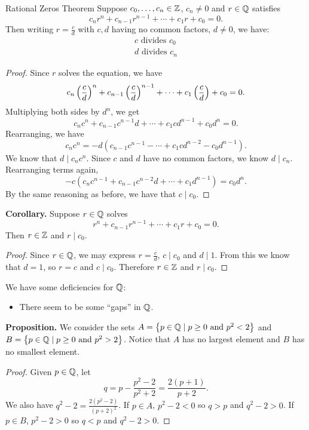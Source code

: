 \documentclass[class=article, crop=false]{standalone}
\begin{document}
  \begin{theorem}{Rational Zeros Theorem}
    Suppose $c_0,\dotsc,c_n\in\mathbb{Z}$, $c_n\neq 0$ and $r\in\mathbb{Q}$ satisfies
    \[
      c_nr^n + c_{n-1}r^{n-1} + \dotsb + c_1r + c_0 = 0.
    \]
    Then writing $r = \frac{c}{d}$ with $c, d$ having no common factors, $d\neq 0$, we have:
    \begin{align*}
      c \text{ divides } c_0 \\
      d \text{ divides } c_n
    \end{align*}
    \begin{proof}
      Since $r$ solves the equation, we have
      \[
        c_n \left( \frac{c}{d} \right)^n + c_{n-1} \left( \frac{c}{d} \right)^{n-1} + \dotsb + c_1 \left( \frac{c}{d} \right) + c_0 = 0.
      \]
      Multiplying both sides by $d^n$, we get
      \[
        c_nc^n + c_{n-1}c^{n-1}d + \dotsb + c_1cd^{n-1} + c_0d^n = 0.
      \]
      Rearranging, we have
      \[
        c_nc^n =  -d(c_{n-1}c^{n-1} - \dotsb + c_1cd^{n-2} - c_0d^{n-1}).
      \]
      We know that $d\mid c_nc^n$. Since $c$ and $d$ have no common factors, we know $d\mid c_n$.
      Rearranging terms again,
      \[
        -c(c_nc^{n-1} + c_{n-1}c^{n-2}d + \dotsb + c_1d^{n-1}) = c_0d^n.
      \]
      By the same reasoning as before, we have that $c\mid c_0$.
    \end{proof}
  \end{theorem}
  \textbf{Corollary.} Suppose $r\in\mathbb{Q}$ solves
  \[
    r^n + c_{n-1}r^{n-1} + \dotsb + c_1r + c_0 = 0.
  \]
  Then $r\in\mathbb{Z}$ and $r\mid c_0$.
  \begin{proof}
    Since $r\in\mathbb{Q}$, we may express $r = \frac{c}{d}$, $c\mid c_0$ and $d\mid 1$. From this we know that $d = 1$, so $r = c$ and $c\mid c_0$. Therefore $r\in\mathbb{Z}$ and $r\mid c_0$.
  \end{proof}
  We have some deficiencies for $\mathbb{Q}$:
  \begin{itemize}
    \item There seem to be some ``gaps'' in $\mathbb{Q}$.
  \end{itemize}
  \textbf{Proposition.} We consider the sets $A = \left\{p\in\mathbb{Q}\mid p\geq 0 \text{ and }p^2 < 2\right\}$ and $B = \left\{p\in\mathbb{Q}\mid p\geq 0 \text{ and } p^2 > 2\right\}$. Notice that $A$ has no largest element and $B$ has no smallest element.
  \begin{proof}
    Given $p\in\mathbb{Q}$, let
    \[
      q = p - \frac{p^2-2}{p^2+2} = \frac{2(p + 1)}{p + 2}.
    \]
    We also have $q^2 - 2 = \frac{2(p^2-2)}{(p+2)^2}$. If $p\in A$, $p^2 - 2 < 0$ so $q > p$ and $q^2 - 2 > 0$. If $p\in B$, $p^2 - 2 > 0$ so $q < p$ and $q^2 - 2 > 0$.
  \end{proof}
\end{document}
